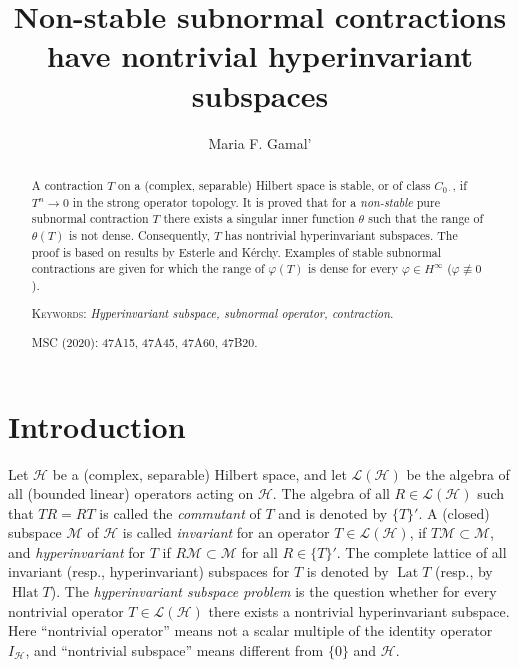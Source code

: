 \documentclass[a4paper,oneside,11pt]{amsart}
\numberwithin{equation}{section}
\theoremstyle{plain}
\theoremstyle{definition}
\begin{document}
\title[Existence of hyperinvariant subspaces]{Non-stable subnormal contractions have nontrivial hyperinvariant subspaces}

\author{Maria F. Gamal'}
\address{
MARIA F. GAMAL', 
St. Petersburg Branch\\ V. A. Steklov Institute 
of Mathematics\\
 Russian Academy of Sciences\\ Fontanka 27, St. Petersburg\\ 
191023, Russia  
}



\begin{abstract}
A contraction $T$ on a (complex, separable) Hilbert space  is stable, or of class $C_{0\cdot}$, 
if $T^n\to 0$ in the strong operator topology. It is proved that for  a \emph{non-stable} pure subnormal contraction $T$ 
there exists a singular inner function $\theta$ such that the range of $\theta(T)$ is not dense. Consequently, $T$ has 
 nontrivial hyperinvariant subspaces. The proof is based on results by Esterle and K\'erchy. 
Examples of stable subnormal contractions are given for which the range of $\varphi(T)$ is dense
 for every $\varphi\in H^\infty$
($\varphi\not\equiv 0$). 
\smallskip

\noindent \textsc{Keywords:} \emph{Hyperinvariant subspace,  subnormal operator, contraction.}


\smallskip

\noindent MSC (2020): 47A15, 47A45,  47A60, 47B20.

 \end{abstract}


\maketitle



\section{Introduction}

Let $\mathcal H$ be a (complex, separable) Hilbert space, and let  $\mathcal L(\mathcal H)$ be the algebra of all (bounded linear) operators acting on  $\mathcal H$.
 The algebra of all $R\in\mathcal L(\mathcal H)$  such that $TR=RT$ is called the \emph{commutant} of $T$ and is denoted by  $\{T\}'$.  A (closed) subspace  $\mathcal M$ of  $\mathcal H$ is called \emph{invariant} 
for an operator  $T\in\mathcal L(\mathcal H)$, if $T\mathcal M\subset\mathcal M$, and \emph{hyperinvariant} 
for $T$ if $R\mathcal M\subset\mathcal M$ for all $R\in\{T\}'$. The complete lattice of all invariant (resp.,  hyperinvariant) subspaces for  $T$ is denoted by  $\operatorname{Lat}T$ (resp., by 
$\operatorname{Hlat}T$). 
 The \emph{hyperinvariant subspace problem}  is the question whether for every nontrivial operator 
$T\in\mathcal L(\mathcal H)$ there exists a nontrivial hyperinvariant subspace. 
Here ``nontrivial operator'' means  not a scalar multiple of the identity operator $I_{\mathcal H}$, 
and ``nontrivial subspace'' means  different from  $\{0\}$ and  $\mathcal H$.
\end{document}

